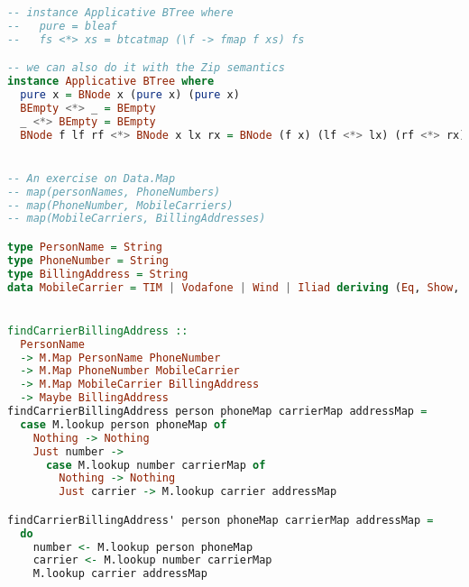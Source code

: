 \begin{lstlisting}[language=Haskell]
-- instance Applicative BTree where
--   pure = bleaf
--   fs <*> xs = btcatmap (\f -> fmap f xs) fs

-- we can also do it with the Zip semantics
instance Applicative BTree where
  pure x = BNode x (pure x) (pure x)
  BEmpty <*> _ = BEmpty
  _ <*> BEmpty = BEmpty
  BNode f lf rf <*> BNode x lx rx = BNode (f x) (lf <*> lx) (rf <*> rx)


-- An exercise on Data.Map
-- map(personNames, PhoneNumbers)
-- map(PhoneNumber, MobileCarriers)
-- map(MobileCarriers, BillingAddresses)

type PersonName = String
type PhoneNumber = String
type BillingAddress = String
data MobileCarrier = TIM | Vodafone | Wind | Iliad deriving (Eq, Show, Ord)


findCarrierBillingAddress ::
  PersonName
  -> M.Map PersonName PhoneNumber
  -> M.Map PhoneNumber MobileCarrier
  -> M.Map MobileCarrier BillingAddress
  -> Maybe BillingAddress
findCarrierBillingAddress person phoneMap carrierMap addressMap =
  case M.lookup person phoneMap of
    Nothing -> Nothing
    Just number ->
      case M.lookup number carrierMap of
        Nothing -> Nothing
        Just carrier -> M.lookup carrier addressMap

findCarrierBillingAddress' person phoneMap carrierMap addressMap =
  do
    number <- M.lookup person phoneMap
    carrier <- M.lookup number carrierMap
    M.lookup carrier addressMap
\end{lstlisting}